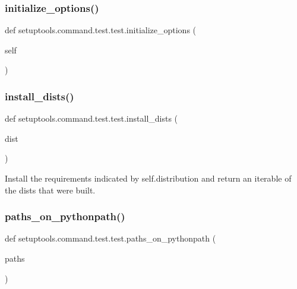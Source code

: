 \subsubsection{\texorpdfstring{initialize\+\_\+options()}{initialize\_options()}}
{\footnotesize\ttfamily def setuptools.\+command.\+test.\+test.\+initialize\+\_\+options (\begin{DoxyParamCaption}\item[{}]{self }\end{DoxyParamCaption})}

\mbox{\label{classsetuptools_1_1command_1_1test_1_1test_af0362ad01b35d885c41cb12f395c6987}} 
\subsubsection{\texorpdfstring{install\+\_\+dists()}{install\_dists()}}
{\footnotesize\ttfamily def setuptools.\+command.\+test.\+test.\+install\+\_\+dists (\begin{DoxyParamCaption}\item[{}]{dist }\end{DoxyParamCaption})\hspace{0.3cm}{\ttfamily [static]}}

\begin{DoxyVerb}Install the requirements indicated by self.distribution and
return an iterable of the dists that were built.
\end{DoxyVerb}
 \mbox{\label{classsetuptools_1_1command_1_1test_1_1test_a222ab40c892904a39bf415edf4b62ab4}} 
\subsubsection{\texorpdfstring{paths\+\_\+on\+\_\+pythonpath()}{paths\_on\_pythonpath()}}
{\footnotesize\ttfamily def setuptools.\+command.\+test.\+test.\+paths\+\_\+on\+\_\+pythonpath (\begin{DoxyParamCaption}\item[{}]{paths }\end{DoxyParamCaption})\hspace{0.3cm}{\ttfamily [static]}}

